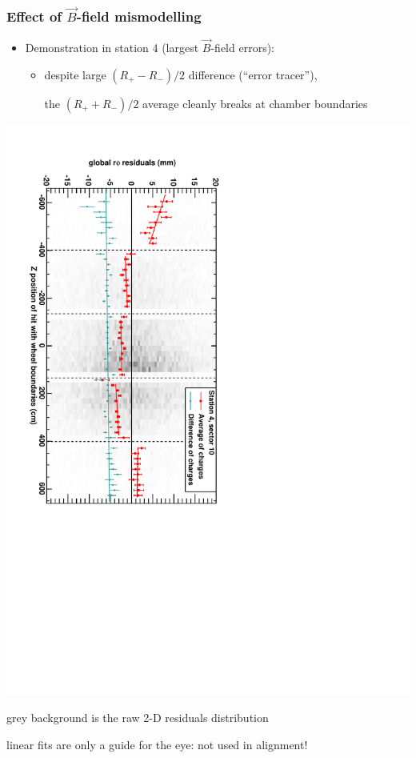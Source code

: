 \documentclass[compress]{beamer}
\begin{document}
\begin{frame}
\frametitle{Effect of $\vec{B}$-field mismodelling}
\begin{itemize}
\item Demonstration in station 4 (largest $\vec{B}$-field errors):
\begin{itemize}
\item despite large $(R_+ - R_-)/2$ difference (``error tracer''),

\vspace{0.2 cm}
the $(R_+ + R_-)/2$ average cleanly breaks at chamber boundaries
\end{itemize}
\end{itemize}

\includegraphics[height=\linewidth, angle=90]{demo_of_bfield.pdf}

\scriptsize grey background is the raw 2-D residuals distribution

linear fits are only a guide for the eye: not used in alignment!
\end{frame}
\end{document}
